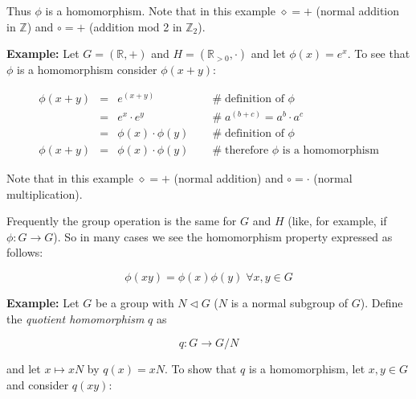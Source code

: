 \documentclass[11pt, oneside]{article}   	%
\theoremstyle{definition}
\begin{document}
 \bigskip
 \noindent
 Thus $\phi$ is a homomorphism. Note that in this example  $\diamond = +$ (normal addition in $\mathbb{Z}$) and $\circ = +$ (addition mod 2 in $\mathbb{Z}_2$).



\bigskip
\noindent
\textbf{Example:} Let $G = (\mathbb{R}, +)$ and $H = (\mathbb{R}_{> 0}, \cdot)$ and let $\phi(x) = e^x$. To see that $\phi$ is a homomorphism
consider $\phi(x + y)$:

\begin{equation*}
\begin{array}{rcll}
\phi(x + y) 
&=& e^{(x + y)}                               &\quad \mathrel{\#} \text{definition of $\phi$}   \\
&=& e^x \cdot e^y                          &\quad \mathrel{\#} a^{(b + c)} = a^b \cdot a^c \\
&=& \phi(x) \cdot \phi(y)                     &\quad \mathrel{\#} \text{definition of $\phi$}                    \\
\phi(x + y)  &=&   \phi(x) \cdot \phi(y)   &\quad \mathrel{\#} \text{therefore $\phi$ is a homomorphism}
\end{array}
\end{equation*}

\bigskip
\noindent
Note that in this example $\diamond = +$ (normal addition) and $\circ = \cdot$ (normal multiplication). 

\bigskip
\noindent
Frequently the group operation is the same
for $G$ and $H$ (like, for example, if $\phi: G \rightarrow G$). So in many cases we see the homomorphism property expressed as follows:

\begin{equation*}
\phi(xy) = \phi(x)\phi(y) \; \forall x,y \in G
\end{equation*}

\bigskip
\noindent
\textbf{Example:}  Let $G$  be a group with $N \lhd G$ ($N$ is a normal subgroup of $G$). Define the \emph{quotient homomorphism} $q$ as 

\begin{equation*}
q: G \rightarrow  G/N 
\end{equation*}

\bigskip
\noindent
and let $x \mapsto  xN$ by $q(x) = xN$. To show that $q$ is a homomorphism, let $x,y \in G$ and consider $q(xy)$:
\end{document}

